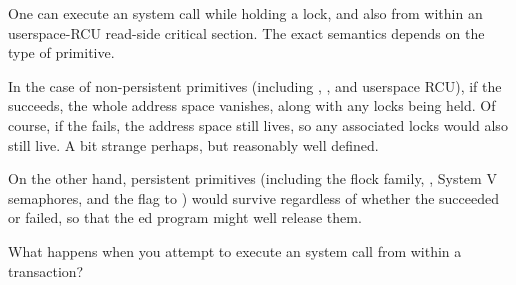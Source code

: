 One can execute an  system call while holding a lock, and
also from within an userspace-RCU read-side critical section.
The exact semantics depends on the type of primitive.

In the case of non-persistent primitives (including
, , and userspace RCU),
if the  succeeds, the whole address space vanishes, along
with any locks being held.
Of course, if the  fails, the address space still lives,
so any associated locks would also still live.
A bit strange perhaps, but reasonably well defined.

On the other hand, persistent primitives (including the flock family,
, System V semaphores, and the  flag to
) would survive regardless of whether the 
succeeded or failed, so that the ed program might well
release them.

\QuickQuizEnd

What happens when you attempt to execute an  system call
from within a transaction?

